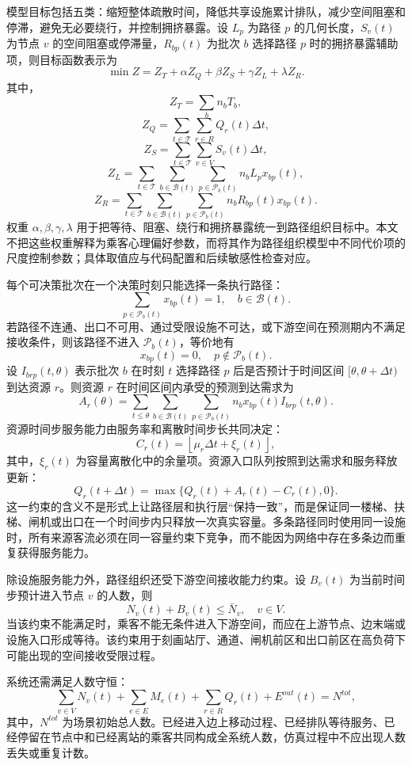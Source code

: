 \documentclass[UTF8,a4paper,12pt]{ctexart}
\begin{document}
模型目标包括五类：缩短整体疏散时间，降低共享设施累计排队，减少空间阻塞和停滞，避免无必要绕行，并控制拥挤暴露。设 \(L_p\) 为路径 \(p\) 的几何长度，\(S_v(t)\) 为节点 \(v\) 的空间阻塞或停滞量，\(R_{bp}(t)\) 为批次 \(b\) 选择路径 \(p\) 时的拥挤暴露辅助项，则目标函数表示为
\[
\min Z=Z_T+\alpha Z_Q+\beta Z_S+\gamma Z_L+\lambda Z_R.
\]
其中，
\[
Z_T=\sum_{b} n_b T_b,
\]
\[
Z_Q=\sum_{t\in\mathcal T}\sum_{r\in R} Q_r(t)\Delta t,
\]
\[
Z_S=\sum_{t\in\mathcal T}\sum_{v\in V} S_v(t)\Delta t,
\]
\[
Z_L=\sum_{t\in\mathcal T}\sum_{b\in\mathcal B(t)}\sum_{p\in\mathcal P_b(t)}n_b L_p x_{bp}(t),
\]
\[
Z_R=\sum_{t\in\mathcal T}\sum_{b\in\mathcal B(t)}\sum_{p\in\mathcal P_b(t)}n_b R_{bp}(t)x_{bp}(t).
\]
权重 \(\alpha,\beta,\gamma,\lambda\) 用于把等待、阻塞、绕行和拥挤暴露统一到路径组织目标中。本文不把这些权重解释为乘客心理偏好参数，而将其作为路径组织模型中不同代价项的尺度控制参数；具体取值应与代码配置和后续敏感性检查对应。

每个可决策批次在一个决策时刻只能选择一条执行路径：
\[
\sum_{p\in\mathcal P_b(t)}x_{bp}(t)=1,\quad b\in\mathcal B(t).
\]
若路径不连通、出口不可用、通过受限设施不可达，或下游空间在预测期内不满足接收条件，则该路径不进入 \(\mathcal P_b(t)\)，等价地有
\[
x_{bp}(t)=0,\quad p\notin\mathcal P_b(t).
\]
设 \(I_{brp}(t,\theta)\) 表示批次 \(b\) 在时刻 \(t\) 选择路径 \(p\) 后是否预计于时间区间 \([\theta,\theta+\Delta t)\) 到达资源 \(r\)。则资源 \(r\) 在时间区间内承受的预测到达需求为
\[
A_r(\theta)=\sum_{t\leq \theta}\sum_{b\in\mathcal B(t)}\sum_{p\in\mathcal P_b(t)} n_b x_{bp}(t)I_{brp}(t,\theta).
\]
资源时间步服务能力由服务率和离散时间步长共同决定：
\[
C_r(t)=\left\lfloor \mu_r\Delta t+\xi_r(t)\right\rfloor,
\]
其中，\(\xi_r(t)\) 为容量离散化中的余量项。资源入口队列按照到达需求和服务释放更新：
\[
Q_r(t+\Delta t)=\max\{Q_r(t)+A_r(t)-C_r(t),0\}.
\]
这一约束的含义不是形式上让路径层和执行层“保持一致”，而是保证同一楼梯、扶梯、闸机或出口在一个时间步内只释放一次真实容量。多条路径同时使用同一设施时，所有来源客流必须在同一容量约束下竞争，而不能因为网络中存在多条边而重复获得服务能力。

除设施服务能力外，路径组织还受下游空间接收能力约束。设 \(B_v(t)\) 为当前时间步预计进入节点 \(v\) 的人数，则
\[
N_v(t)+B_v(t)\leq \bar N_v,\quad v\in V.
\]
当该约束不能满足时，乘客不能无条件进入下游空间，而应在上游节点、边末端或设施入口形成等待。该约束用于刻画站厅、通道、闸机前区和出口前区在高负荷下可能出现的空间接收受限过程。

系统还需满足人数守恒：
\[
\sum_{v\in V}N_v(t)+\sum_{e\in E}M_e(t)+\sum_{r\in R}Q_r(t)+E^{out}(t)=N^{tot},
\]
其中，\(N^{tot}\) 为场景初始总人数。已经进入边上移动过程、已经排队等待服务、已经停留在节点中和已经离站的乘客共同构成全系统人数，仿真过程中不应出现人数丢失或重复计数。
\end{document}
